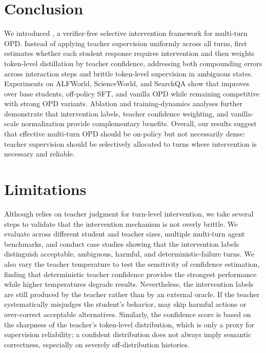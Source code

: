 \section{Conclusion}

We introduced \ours{}, a verifier-free selective intervention framework for multi-turn OPD. Instead of applying teacher supervision uniformly across all turns, \ours{} first estimates whether each student response requires intervention and then weights token-level distillation by teacher confidence, addressing both compounding errors across interaction steps and brittle token-level supervision in ambiguous states. Experiments on ALFWorld, ScienceWorld, and SearchQA show that \ours{} improves over base students, off-policy SFT, and vanilla OPD while remaining competitive with strong OPD variants. Ablation and training-dynamics analyses further demonstrate that intervention labels, teacher confidence weighting, and vanilla-scale normalization provide complementary benefits. Overall, our results suggest that effective multi-turn OPD should be on-policy but not necessarily dense: teacher supervision should be selectively allocated to turns where intervention is necessary and reliable.



\section{Limitations}
\label{sec:limitations}

Although \ours{} relies on teacher judgment for turn-level intervention, we take several steps to validate that the intervention mechanism is not overly brittle.
%
We evaluate across different student and teacher sizes, multiple multi-turn agent benchmarks, and conduct case studies showing that the intervention labels distinguish acceptable, ambiguous, harmful, and deterministic-failure turns.
%
We also vary the teacher temperature to test the sensitivity of confidence estimation, finding that deterministic teacher confidence provides the strongest performance while higher temperatures degrade results.
%
Nevertheless, the intervention labels are still produced by the teacher rather than by an external oracle.
%
If the teacher systematically misjudges the student's behavior, \ours{} may skip harmful actions or over-correct acceptable alternatives.
%
Similarly, the confidence score is based on the sharpness of the teacher's token-level distribution, which is only a proxy for supervision reliability; a confident distribution does not always imply semantic correctness, especially on severely off-distribution histories.

